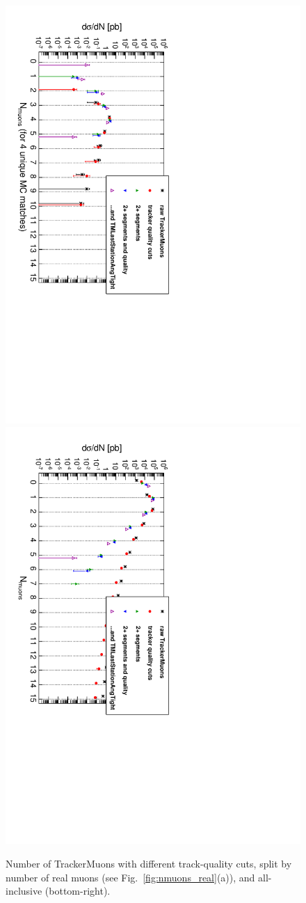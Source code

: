 \documentclass[12pt]{article}
\begin{document}
\begin{figure}[p]
\includegraphics[height=0.5\linewidth, angle=90]{fig/backgroundsMatching_plot/tracks_cuts_4real.pdf}
\includegraphics[height=0.5\linewidth, angle=90]{fig/backgroundsMatching_plot/tracks_cuts_allreal.pdf}

\caption{Number of TrackerMuons with different track-quality cuts, split by number of real muons (see Fig.~\ref{fig:nmuons_real}(a)), and all-inclusive (bottom-right). \label{fig:tracks_cuts}}
\end{figure}
\end{document}
